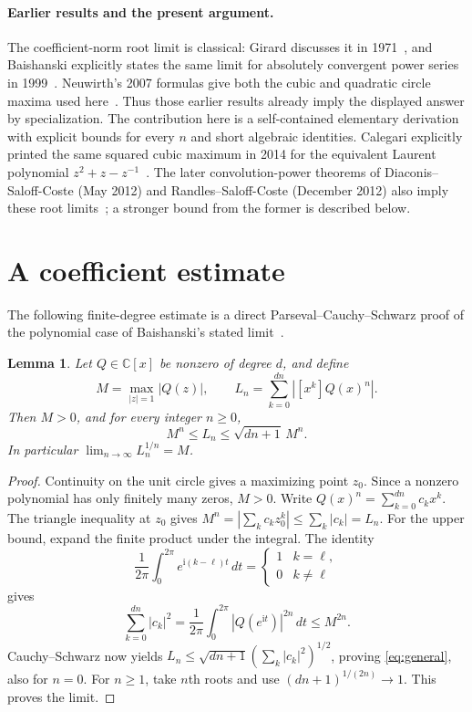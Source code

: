 \documentclass[11pt]{article}
\newtheorem{lemma}[theorem]{Lemma}
\begin{document}
\paragraph{Earlier results and the present argument.}
The coefficient-norm root limit is classical: Girard discusses it in
1971~\cite[\S1, pp.~357--358]{girard}, and Baishanski explicitly states
the same limit for absolutely convergent power series
in 1999~\cite[\S28.1, p.~523]{baishanski}.
Neuwirth's 2007 formulas give both the cubic and quadratic circle
maxima used here~\cite[Remarks~6.3--6.4, pp.~13--14]{neuwirth}.
Thus those earlier results already imply the displayed answer by
specialization. The contribution here is a self-contained elementary
derivation with explicit bounds for every $n$ and short algebraic identities.
Calegari explicitly printed the same squared cubic maximum in
2014 for the equivalent Laurent polynomial $z^2+z-z^{-1}$~\cite{calegari}.
The later convolution-power theorems of Diaconis--Saloff-Coste
(May 2012) and Randles--Saloff-Coste (December 2012) also imply these
root limits~\cite{diaconis,randles}; a stronger bound from the former
is described below.

\section{A coefficient estimate}
The following finite-degree estimate is a direct Parseval--Cauchy--Schwarz
proof of the polynomial case of Baishanski's stated limit~\cite{baishanski}.
\begin{lemma}\label{lem:general}
Let $Q\in\mathbb C[x]$ be nonzero of degree $d$, and define
\[
 M=\max_{|z|=1}|Q(z)|,\qquad
 L_n=\sum_{k=0}^{dn}|[x^k]Q(x)^n|.
\]
Then $M>0$, and for every integer $n\geq0$,
\begin{equation}\label{eq:general}
 M^n\leq L_n\leq\sqrt{dn+1}\,M^n.
\end{equation}
In particular $\lim_{n\to\infty}L_n^{1/n}=M$.
\end{lemma}
\begin{proof}
Continuity on the unit circle gives a maximizing point $z_0$.
Since a nonzero polynomial has only finitely many zeros, $M>0$.
Write $Q(x)^n=\sum_{k=0}^{dn}c_kx^k$.
The triangle inequality at $z_0$ gives
$M^n=|\sum_kc_kz_0^k|\leq\sum_k|c_k|=L_n$.
For the upper bound, expand the finite product under the integral.
The identity
\[
 \frac1{2\pi}\int_0^{2\pi}e^{\mathrm i(k-\ell)t}\,dt
 =\begin{cases}1&k=\ell,\\0&k\ne\ell\end{cases}
\]
gives
\[
 \sum_{k=0}^{dn}|c_k|^2
 =\frac1{2\pi}\int_0^{2\pi}|Q(e^{\mathrm it})|^{2n}\,dt
 \leq M^{2n}.
\]
Cauchy--Schwarz now yields
$L_n\leq\sqrt{dn+1}(\sum_k|c_k|^2)^{1/2}$, proving
\eqref{eq:general}, also for $n=0$.
For $n\geq1$, take $n$th roots and use
$(dn+1)^{1/(2n)}\to1$. This proves the limit.
\end{proof}
\end{document}
